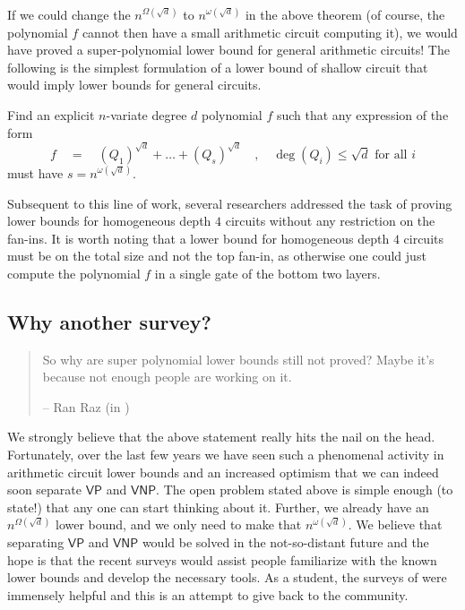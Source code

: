 \documentclass[12pt]{report}
\newcommand{\VP}{\mathsf{VP}}
\newcommand{\VNP}{\mathsf{VNP}}
\begin{document}
If we could change the $n^{\Omega(\sqrt{d})}$ to $n^{\omega(\sqrt{d})}$ in the above theorem (of course, the polynomial $f$ cannot then have a small arithmetic circuit computing it), we would have proved a super-polynomial lower bound for general arithmetic circuits! The following is the simplest formulation of a lower bound of shallow circuit that would imply lower bounds for general circuits. \\

\begin{mdframed}
\begin{openproblem}\label{openprob:main} Find an explicit $n$-variate degree $d$ polynomial $f$ such that any expression of the form
\[
f \quad=\quad (Q_1)^{\sqrt{d}} + \dots + (Q_{s})^{\sqrt{d}}\quad,\quad \deg(Q_i) \leq \sqrt{d} \text{ for all $i$}
\]
must have $s = n^{\omega(\sqrt{d})}$. 
\end{openproblem}
\end{mdframed}
\bigskip 

Subsequent to this line of work, several researchers addressed the task of proving lower bounds for homogeneous depth $4$ circuits without any restriction on the fan-ins. It is worth noting that a lower bound for homogeneous depth $4$ circuits must be on the total size and not the top fan-in, as otherwise one could just compute the polynomial $f$ in a single gate of the bottom two layers. 

\pagebreak[4]
\subsection*{Why another survey?}

\begin{quote}
So why are super polynomial lower bounds still not proved?  Maybe it's because not enough people are working on it.  
\begin{flushright}
-- Ran Raz (in \cite{raz10fool})
\end{flushright}
\end{quote}


We strongly believe that the above statement really hits the nail on the head. Fortunately, over the last few years we have seen such a phenomenal activity in arithmetic circuit lower bounds and an increased optimism that we can indeed soon separate $\VP$ and $\VNP$. The open problem stated above is simple enough (to state!) that any one can start thinking about it. Further, we already have an $n^{\Omega(\sqrt{d})}$ lower bound, and we only need to make that $n^{\omega(\sqrt{d})}$. We believe that separating $\VP$ and $\VNP$ would be solved in the not-so-distant future and the hope is that the recent surveys would assist people familiarize with the known lower bounds and develop the necessary tools. As a student, the surveys of \cite{sy10,ckw11} were immensely helpful and this is an attempt to give back to the community. 
\end{document}
